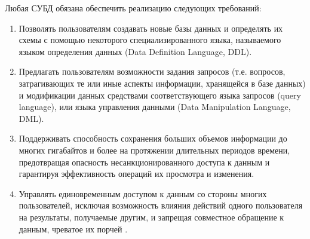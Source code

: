 Любая СУБД обязана обеспечить реализацию следующих
требований:

\begin{enumerate}
\item Позволять пользователям создавать новые базы данных и определять их схемы
с помощью некоторого специализированного языка, называемого языком определения
данных (Data Definition Language, DDL).

\item Предлагать пользователям возможности задания запросов (т.е.
вопросов, затрагивающих те или иные аспекты информации, хранящейся в базе данных)
и модификации данных средствами соответствующего языка запросов (query
language), или языка управления данными (Data Manipulation Language, DML).

\item Поддерживать способность сохранения больших объемов информации до многих
гигабайтов и более на протяжении длительных периодов времени, предотвращая
опасность несанкционированного доступа к данным и гарантируя эффективность
операций их просмотра и изменения.

\item Управлять единовременным доступом к данным со стороны многих пользователей,
исключая возможность влияния действий одного пользователя на результаты, получаемые
другим, и запрещая совместное обращение к данным, чреватое их порчей \cite{2}.

\end{enumerate}